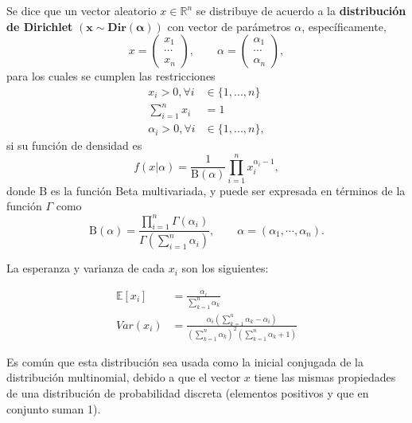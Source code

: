 \begin{defin}
    Se dice que un vector aleatorio $x \in \mathbb{R}^n$ se distribuye de acuerdo a la \textbf{distribuci\'on de Dirichlet}  $\mathbf{(x \sim Dir(\alpha))}$ con vector de par\'ametros $\alpha$, espec\'ificamente,
    \begin{equation*}
        x = 
        \left(\begin{array}{c}
            x_1  \\
            \cdots \\
            x_n
        \end{array}\right),
        \qquad
        \alpha = 
        \left(\begin{array}{c}
            \alpha_1  \\
            \cdots \\
            \alpha_n
        \end{array}\right),
    \end{equation*}
    para los cuales se cumplen las restricciones
    \begin{equation*}
    \begin{aligned}
        x_i > 0, \forall i &\in \{1,...,n\} \\
        \sum_{i=1}^n x_i &= 1 \\
        \alpha_i > 0, \forall i &\in \{1,...,n\},
    \end{aligned}
    \end{equation*}
    si su funci\'on de densidad  es
    \begin{equation*}
        f(x|\alpha) = 
        \frac {1}{\mathrm {B} (\alpha)}
        \prod _{i=1}^{n}x_{i}^{\alpha _{i}-1},
    \end{equation*}
    donde $\mathrm{B}$ es la funci\'on Beta multivariada, y puede ser expresada en t\'erminos de la funci\'on $\Gamma$ como 
    \begin{equation*}
       \mathrm{B}(\alpha)=
       \frac {\prod _{i=1}^{n}\Gamma (\alpha _{i})}
       {\Gamma \left(\sum _{i=1}^{n}\alpha _{i}\right)},
       \qquad 
       \alpha =(\alpha _1,\cdots ,\alpha _n). 
    \end{equation*}
    
    La esperanza y varianza de cada $x_i$ son los siguientes:
    
    \begin{equation*}
    \begin{aligned}
        \mathbb{E}[x_i] &= \frac{\alpha_i}{\sum_{k=1}^n \alpha_k} \\
        Var(x_i) &= \frac
        {\alpha_i \left( \sum_{k=1}^n \alpha_k - \alpha_i \right)}
        {\left( \sum_{k=1}^n \alpha_k \right)^2 \left( \sum_{k=1}^n \alpha_k + 1 \right)}
    \end{aligned}
    \end{equation*}
    
\end{defin}

Es com\'un que esta distribuci\'on sea usada como la inicial conjugada de la distribuci\'on multinomial, debido a que el vector $x$ tiene las mismas propiedades de una distribuci\'on de probabilidad discreta (elementos positivos y que en conjunto suman 1).